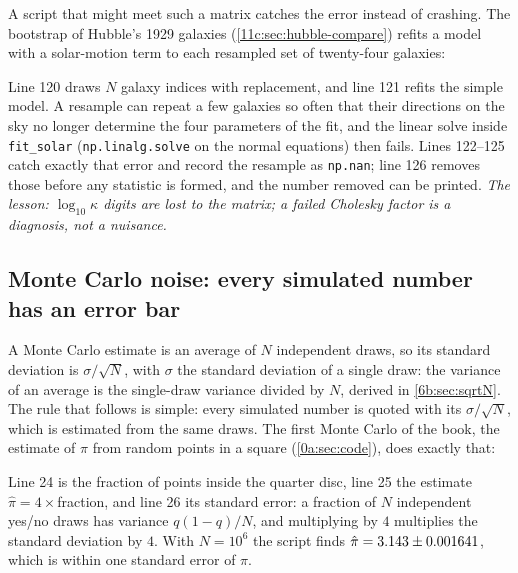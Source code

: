 A script that might meet such a matrix catches the error instead of crashing. The bootstrap of Hubble's 1929 galaxies (\cref{11c:sec:hubble-compare}) refits a model with a solar-motion term to each resampled set of twenty-four galaxies:


Line 120 draws $N$ galaxy indices with replacement, and line 121 refits the simple model. A resample can repeat a few galaxies so often that their directions on the sky no longer determine the four parameters of the fit, and the linear solve inside \texttt{fit\_solar} (\texttt{np.linalg.solve} on the normal equations) then fails. Lines 122--125 catch exactly that error and record the resample as \texttt{np.nan}; line 126 removes those before any statistic is formed, and the number removed can be printed. \emph{The lesson: $\log_{10}\kappa$ digits are lost to the matrix; a failed Cholesky factor is a diagnosis, not a nuisance.}

\subsection{Monte Carlo noise: every simulated number has an error bar}
\label{T0a:sec:trust-mc}

A Monte Carlo estimate is an average of $N$ independent draws, so its standard deviation is $\sigma/\sqrt N$, with $\sigma$ the standard deviation of a single draw: the variance of an average is the single-draw variance divided by $N$, derived in \cref{6b:sec:sqrtN}. The rule that follows is simple: every simulated number is quoted with its $\sigma/\sqrt N$, which is estimated from the same draws. The first Monte Carlo of the book, the estimate of $\pi$ from random points in a square (\cref{0a:sec:code}), does exactly that:


Line 24 is the fraction of points inside the quarter disc, line 25 the estimate $\hat\pi=4\times$fraction, and line 26 its standard error: a fraction of $N$ independent yes/no draws has variance $q(1-q)/N$, and multiplying by $4$ multiplies the standard deviation by $4$. With $N=10^6$ the script finds $\hat\pi=3.143\pm0.001641$, which is within one standard error of $\pi$.

